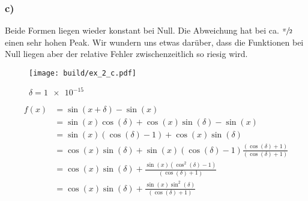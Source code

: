 \subsubsection*{c)}
Beide Formen liegen wieder konstant bei Null. 
Die Abweichung hat bei ca. $\sfrac{\pi}{2}$ einen sehr hohen Peak.
Wir wundern uns etwas darüber, dass die Funktionen bei Null liegen aber der relative Fehler zwischenzeitlich so riesig wird.
\begin{figure}
    \centering
    \texttt{[image: build/ex\_2\_c.pdf]}
    \caption{$\delta = \num{1e-15}$}
    \label{fig:c}
\end{figure}
\begin{align*}
    f(x) &= \sin(x + \delta) - \sin(x)                                                              \\
    &= \sin(x) \cos(\delta) + \cos(x) \sin (\delta) - \sin(x)                                       \\
    &= \sin(x) (\cos(\delta) -1) + \cos(x) \sin(\delta)                                             \\
    &= \cos(x) \sin(\delta) + \sin(x) (\cos(\delta) -1) \frac{(\cos(\delta) +1)}{(\cos(\delta) +1)} \\
    &= \cos(x) \sin(\delta) + \frac{\sin(x) (\cos^2(\delta) - 1)}{(\cos(\delta) +1)}                \\
    &= \cos(x) \sin(\delta) + \frac{\sin(x) \sin^2(\delta)}{(\cos(\delta) +1)}                      \\
\end{align*}  